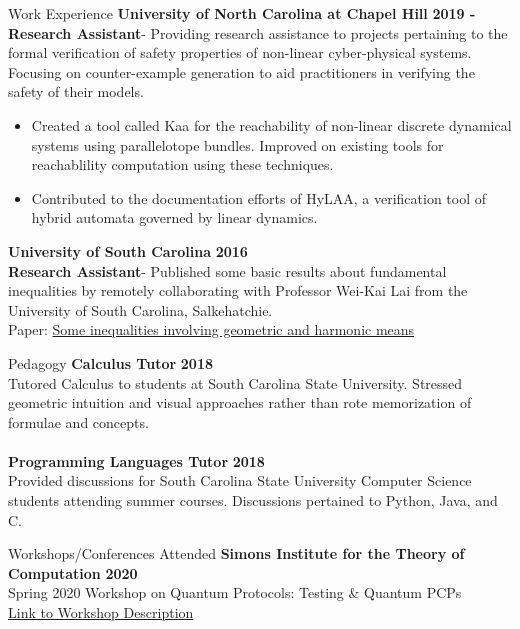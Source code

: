 \documentclass{resume} %
\begin{document}
\begin{rSection}{Work Experience}
{\bf University of North Carolina at Chapel Hill} \hfill {\bf 2019 -} \\
{\bf Research Assistant}- Providing research assistance to projects pertaining to the formal verification of safety properties of non-linear cyber-physical systems. Focusing on counter-example generation to aid practitioners in verifying the safety of their models.
\begin{itemize}
\item Created a tool called Kaa for the reachability of non-linear discrete dynamical systems using parallelotope bundles. Improved on existing tools for reachablility computation using these techniques.
\item Contributed to the documentation efforts of HyLAA, a verification tool of hybrid automata governed by linear dynamics.
\end{itemize}

{\bf University of South Carolina} \hfill {\bf 2016} \\
{\bf Research Assistant}- Published some basic results about fundamental inequalities by remotely collaborating with Professor Wei-Kai Lai from the University of South Carolina, Salkehatchie. \\
Paper: \href{http://www.m-hikari.com/imf/imf-2016/1-4-2016/51190.html}{Some inequalities involving geometric and harmonic means}
\end{rSection}

\begin{rSection}{Pedagogy}
{\bf Calculus Tutor} \hfill {\bf 2018} \\
Tutored Calculus to students at South Carolina State University. Stressed geometric intuition and visual approaches rather than rote memorization of formulae and concepts. \\
\\
{\bf Programming Languages Tutor} \hfill {\bf 2018} \\
Provided discussions for South Carolina State University Computer Science students attending summer courses. Discussions pertained to Python, Java, and C. \\
\end{rSection}


\begin{rSection}{Workshops/Conferences Attended}
{\bf Simons Institute for the Theory of Computation} \hfill {\bf 2020} \\
Spring 2020 Workshop on Quantum Protocols: Testing \& Quantum PCPs \\
\href{https://simons.berkeley.edu/workshops/quantum-2020-2}{Link to Workshop Description}
\end{rSection}
\end{document}

